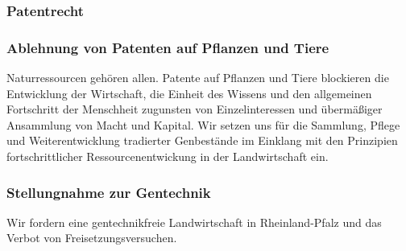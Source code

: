 \subsubsection{Patentrecht}
\label{wp:ip:patent2}

\subsubsection{Ablehnung von Patenten auf Pflanzen und Tiere}
\abstimmung
Naturressourcen gehören allen. Patente auf Pflanzen und Tiere blockieren die Entwicklung der Wirtschaft, die Einheit des Wissens und den allgemeinen Fortschritt der Menschheit zugunsten von Einzelinteressen und übermäßiger Ansammlung von Macht und Kapital. Wir setzen uns für die Sammlung, Pflege und Weiterentwicklung tradierter Genbestände im Einklang mit den Prinzipien fortschrittlicher Ressourcenentwickung in der Landwirtschaft ein.

\subsubsection{Stellungnahme zur Gentechnik}
\abstimmung
Wir fordern eine gentechnikfreie Landwirtschaft in Rheinland-Pfalz und das Verbot von Freisetzungsversuchen.
